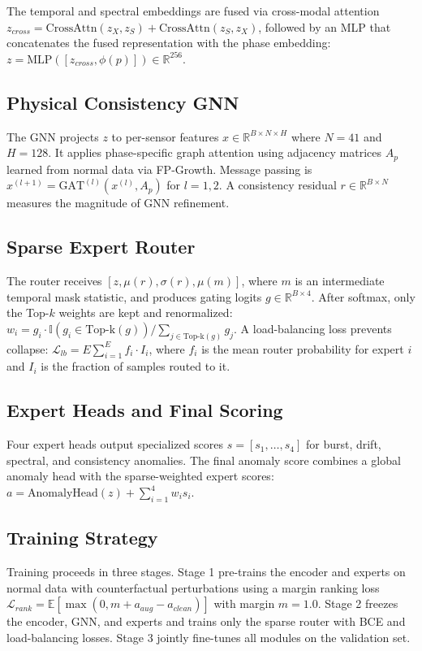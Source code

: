 \documentclass[letterpaper]{article}
\begin{document}
The temporal and spectral embeddings are fused via cross-modal attention \(z_{cross} = \text{CrossAttn}(z_X, z_S) + \text{CrossAttn}(z_S, z_X)\), followed by an MLP that concatenates the fused representation with the phase embedding: \(z = \text{MLP}([z_{cross}, \phi(p)]) \in \mathbb{R}^{256}\).

\subsection{Physical Consistency GNN}
The GNN projects \(z\) to per-sensor features \(x \in \mathbb{R}^{B \times N \times H}\) where \(N=41\) and \(H=128\). It applies phase-specific graph attention using adjacency matrices \(A_p\) learned from normal data via FP-Growth. Message passing is \(x^{(l+1)} = \text{GAT}^{(l)}(x^{(l)}, A_p)\) for \(l=1,2\). A consistency residual \(r \in \mathbb{R}^{B \times N}\) measures the magnitude of GNN refinement.

\subsection{Sparse Expert Router}
The router receives \([z, \mu(r), \sigma(r), \mu(m)]\), where \(m\) is an intermediate temporal mask statistic, and produces gating logits \(g \in \mathbb{R}^{B \times 4}\). After softmax, only the Top-\(k\) weights are kept and renormalized: \(w_i = g_i \cdot \mathbb{I}(g_i \in \text{Top-k}(g)) / \sum_{j \in \text{Top-k}(g)} g_j\). A load-balancing loss prevents collapse: \(\mathcal{L}_{lb} = E \sum_{i=1}^{E} f_i \cdot I_i\), where \(f_i\) is the mean router probability for expert \(i\) and \(I_i\) is the fraction of samples routed to it.

\subsection{Expert Heads and Final Scoring}
Four expert heads output specialized scores \(s = [s_1,\dots,s_4]\) for burst, drift, spectral, and consistency anomalies. The final anomaly score combines a global anomaly head with the sparse-weighted expert scores: \(a = \text{AnomalyHead}(z) + \sum_{i=1}^{4} w_i s_i\).

\subsection{Training Strategy}
Training proceeds in three stages. Stage 1 pre-trains the encoder and experts on normal data with counterfactual perturbations using a margin ranking loss \(\mathcal{L}_{rank} = \mathbb{E}[\max(0, m + a_{aug} - a_{clean})]\) with margin \(m=1.0\). Stage 2 freezes the encoder, GNN, and experts and trains only the sparse router with BCE and load-balancing losses. Stage 3 jointly fine-tunes all modules on the validation set.
\end{document}
